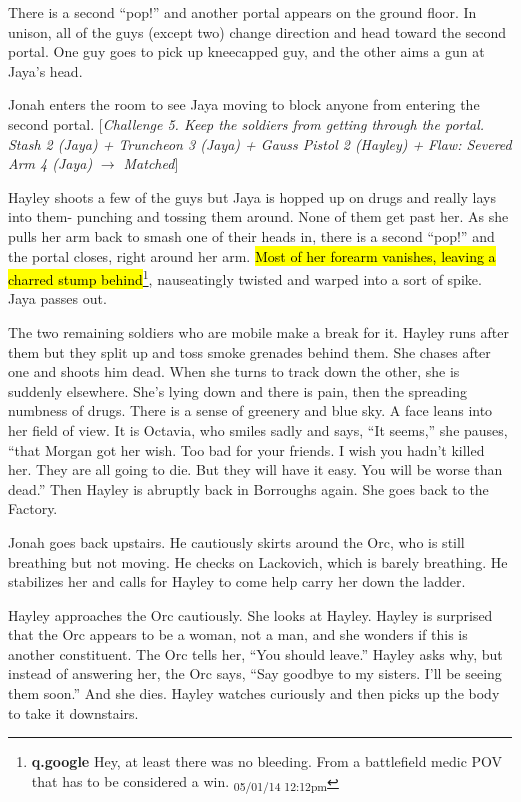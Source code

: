 There is a second ``pop!'' and another portal appears on the ground floor.  In unison, all of the guys (except two) change direction and head toward the second portal.  One guy goes to pick up kneecapped guy, and the other aims a gun at Jaya's head.



Jonah enters the room to see Jaya moving to block anyone from entering the second portal.  {[}\textit{Challenge 5.  Keep the soldiers from getting through the portal.  Stash 2 (Jaya) + Truncheon 3 (Jaya) + Gauss Pistol 2 (Hayley) + }\textit{ {\color[RGB]{255,0,0}Flaw: Severed Arm 4 (Jaya)} }\textit{ $\rightarrow$ Matched}{]}



Hayley shoots a few of the guys but Jaya is hopped up on drugs and really lays into them- punching and tossing them around.   None of them get past her.  As she pulls her arm back to smash one of their heads in, there is a second ``pop!'' and the portal closes, right around her arm.  \hl{Most of her forearm vanishes, leaving a charred stump behind}\footnote{\textbf{q.google }Hey, at least there was no bleeding.  From a battlefield medic POV that has to be considered a win. \textsubscript{05/01/14 12:12pm}}, nauseatingly twisted and warped into a sort of spike.  Jaya passes out.  



The two remaining soldiers who are mobile make a break for it.  Hayley runs after them but they split up and toss smoke grenades behind them.  She chases after one and shoots him dead.  When she turns to track down the other, she is suddenly elsewhere.  She's lying down and there is pain, then the spreading numbness of drugs.  There is a sense of greenery and blue sky.  A face leans into her field of view.  It is Octavia, who smiles sadly and says, ``It seems,'' she pauses, ``that Morgan got her wish.  Too bad for your friends.  I wish you hadn't killed her.  They are all going to die.  But they will have it easy.  You will be worse than dead.''  Then Hayley is abruptly back in Borroughs again.  She goes back to the Factory.



Jonah goes back upstairs.  He cautiously skirts around the Orc, who is still breathing but not moving.  He checks on Lackovich, which is barely breathing.  He stabilizes her and calls for Hayley to come help carry her down the ladder.



Hayley approaches the Orc cautiously.  She looks at Hayley.  Hayley is surprised that the Orc appears to be a woman, not a man, and she wonders if this is another constituent.  The Orc tells her, ``You should leave.''  Hayley asks why, but instead of answering her, the Orc says, ``Say goodbye to my sisters.  I'll be seeing them soon.''  And she dies.  Hayley watches curiously and then picks up the body to take it downstairs.



